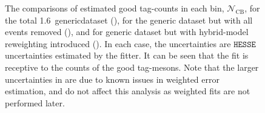 \begin{figure}[htbp!]
    \caption{\label{fig:mc_fit_yield_comparisons}The comparisons of estimated good tag-\B counts in each \EB bin, $\mathcal{N}_{\mathrm{CB}}$,
    for the total 1.6~\invab generic\MC dataset (),
    for the generic \MC dataset but with all \BtoXsgamma events removed (),
    and for generic \MC dataset but with hybrid-model reweighting introduced ().
    In each case, the uncertainties are $\texttt{HESSE}$ uncertainties estimated by the fitter.
    It can be seen that the fit is receptive to the counts of the good tag-\B mesons.
    Note that the larger uncertainties in  are due to known issues in weighted error estimation,
    and do not affect this analysis as weighted fits are not performed later.
    }
\end{figure}